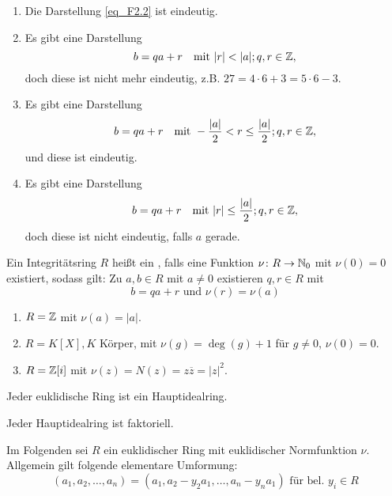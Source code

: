 	\begin{enumerate}[1)]
		\item Die Darstellung \eqref{eq_F2.2} ist eindeutig.
		\item Es gibt eine Darstellung
		\begin{equation}
			b = qa + r \quad \text{mit } |r| < |a|; q,r \in \mathbb{Z}, \label{eq_D'}
		\end{equation}
		doch diese ist nicht mehr eindeutig, z.B. $27 = 4 \cdot 6 + 3 = 5 \cdot 6 - 3$.
		\item Es gibt eine Darstellung
		\begin{equation}
			b = qa + r \quad \text{mit } -\frac{|a|}{2} < r \leq \frac{|a|}{2}; q,r \in \mathbb{Z},
		\end{equation}
		und diese ist eindeutig.
		\item Es gibt eine Darstellung
		\[ b = qa + r \quad \text{mit } |r| \leq \frac{|a|}{2}; q,r \in \mathbb{Z}, \]
		doch diese ist nicht eindeutig, falls $a$ gerade.
	\end{enumerate}

\begin{defn} \label{def_2.3}
	Ein Integritätsring $R$ heißt ein , falls eine Funktion $\nu\colon R \rightarrow \mathbb{N}_0$ mit $\nu(0) = 0$ existiert, sodass gilt: Zu $a, b \in R$ mit $a \neq 0$ existieren $q,r \in R$ mit
	\[b = qa + r \text{ und } \nu(r) = \nu(a) \]
\end{defn}

	\begin{enumerate}[(1)]
		\item $R = \mathbb{Z}$ mit $\nu(a) = |a|$.
		\item $R = K[X], K$ Körper, mit $\nu(g) = \deg(g) + 1$ für $g \neq 0$, $\nu(0) = 0$.
		\item $R = \mathbb{Z}[i]$ mit $\nu(z) = N(z) = z \overline{z} = |z|^2$.
	\end{enumerate}
	
\begin{falko} \label{F2.3}
	Jeder euklidische Ring ist ein Hauptidealring.
\end{falko}

\begin{falko} \label{F2.4}
	Jeder Hauptidealring ist faktoriell.
\end{falko}

Im Folgenden sei $R$ ein euklidischer Ring mit euklidischer Normfunktion $\nu$. Allgemein gilt folgende elementare Umformung:
\begin{equation}
	(a_1,a_2,\dots,a_n) = (a_1, a_2-y_2a_1,\dots,a_n-y_na_1) \text{ für bel. } y_i \in R \label{eq_U}
\end{equation}

